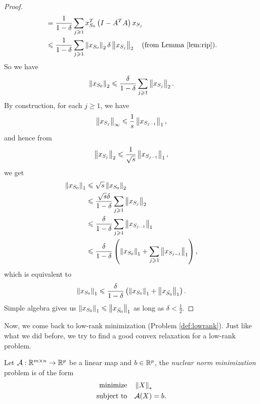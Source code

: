 \documentclass[11pt]{article}
\begin{document}
\begin{proof}
\[\begin{aligned}
    &= \frac{1}{1-\delta}\sum_{j\geqslant 1}x_{S_0}^T\left(I-A^TA\right)x_{S_j}\\
    &\leqslant \frac{1}{1-\delta}\sum_{j\geqslant 1}\left\|x_{S_0}\right\|_2\delta\left\|x_{S_j}\right\|_2\quad\textnormal{(from Lemma \ref{lem:rip})}.
\end{aligned}\]
So we have
\[\left\|x_{S_0}\right\|_2\leqslant\frac{\delta}{1-\delta}\sum_{j\geqslant 1}\left\|x_{S_j}\right\|_2.\]
By construction, for each \(j \geqslant 1\), we have
\[\left\|x_{S_j}\right\|_\infty\leqslant\frac1s\left\|x_{S_{j-1}}\right\|_1,\]
and hence from
\[\left\|x_{S_j}\right\|_2\leqslant\frac{1}{\sqrt s}\left\|x_{S_{j-1}}\right\|_1,\]
we get
\[\begin{aligned}
    \left\|x_{S_0}\right\|_1
    &\leqslant \sqrt s\left\|x_{S_0}\right\|_2\\
    &\leqslant \frac{\sqrt s\delta}{1-\delta}\sum_{j\geqslant 1}\left\|x_{S_j}\right\|_2\\
    &\leqslant \frac{\delta}{1-\delta}\sum_{j\geqslant 1}\left\|x_{S_{j-1}}\right\|_1\\
    &\leqslant \frac{\delta}{1-\delta}\left(\left\|x_{S_0}\right\|_1+\sum_{j\geqslant 1}\left\|x_{S_{j-1}}\right\|_1\right),
\end{aligned}\]
which is equivalent to
\[\left\|x_{S_0}\right\|_1\leqslant\frac{\delta}{1-\delta}\left(\left\|x_{S_0}\right\|_1+\left\|x_{\bar{S_0}}\right\|_1\right).\]
Simple algebra gives us \(\left\|x_{S_0}\right\|_1\leqslant\left\|x_{\bar{S_0}}\right\|_1\) as long as \(\delta<\frac{1}{2}\).
\end{proof}

Now, we come back to low-rank minimization (Problem \ref{def:lowrank}). Just like what we did before, we try to find a good convex relaxation for a low-rank problem. 

\begin{definition}
    Let \(\mathcal{A}:\mathbb R^{m\times n}\to \mathbb R^p\) be a linear map and \(b\in \mathbb R^p\), the \emph{nuclear norm minimization} problem is of the form 
    \[\begin{aligned}
        \textnormal{minimize}\quad & \left\|X\right\|_*\\
        \textnormal{subject to}\quad & \mathcal A(X)=b.
    \end{aligned}\]
\end{definition}
\end{document}
